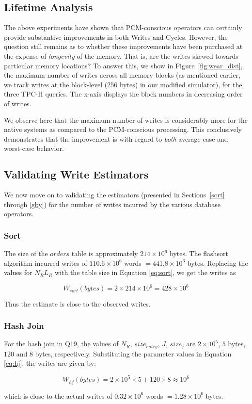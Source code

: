 \subsection{Lifetime Analysis}

The above experiments have shown that PCM-conscious operators
can certainly provide substantive improvements in both Writes and
Cycles. However, the question still remains as to whether these
improvements have been purchased at the expense of \emph{longevity} of
the memory. That is, are the writes skewed towards particular memory
locations?  To answer this, we show in Figure~\ref{fig:wear_dist}, the
maximum number of writes  across all memory blocks (as mentioned earlier,
we track writes at the block-level (256 bytes) in our modified simulator),
for the three TPC-H queries. The x-axis displays the block numbers in
decreasing order of writes.

We observe here that the maximum number of writes is considerably more for the
native systems as compared to the PCM-conscious processing. This
conclusively demonstrates that the improvement is with regard to
\emph{both} average-case and worst-case behavior.

\subsection{Validating Write Estimators}
\label{sec:validation}

We now move on to validating the estimators
(presented in Sections~\ref{sort} through \ref{gby})  for the number of
writes incurred by the various database operators.

\subsubsection{Sort}
The size of the $orders$ table is approximately $214 \times 10^6$ bytes. 
The flashsort algorithm incurred writes of $110.6 \times 10^6$ words $= 441.8 \times 10^6 $
bytes. Replacing the values for $N_R L_R$ with the table size in Equation \ref{eq:sort},
we get the writes as 
\begin{small}
$$W_{sort}(bytes) = 2 \times 214 \times
10^6  = 428 \times 10^6 $$ 
\end{small}
Thus the estimate is close to the observed writes.



\subsubsection{Hash Join}
For the hash join in Q19, the values of $N_R$, $size_{entry}$, $J$,
$size_{j}$ are $2 \times 10^5$, $5$ bytes, $120$ and $8$ bytes, respectively. 
Substituting the parameter values in Equation \ref{eq:hj}, the writes are given by:  
\begin{small}
$$W_{hj}(bytes) = 2 \times 10^5 \times 5 + 120 \times 8 \approx 10^6$$
\end{small}
which is close to the actual writes of $0.32 \times 10^6$ words $=
1.28 \times 10^6$ bytes.

